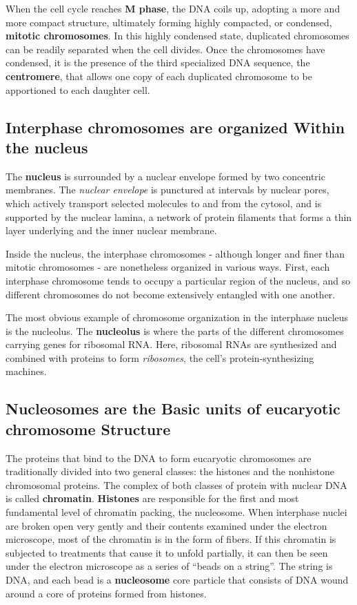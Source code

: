 When the cell cycle reaches \textbf{M phase}, the DNA coils up, adopting a more
and more compact structure, ultimately forming highly compacted, or
condensed, \textbf{mitotic chromosomes}. In this highly condensed state, duplicated
chromosomes can be readily separated when the cell divides.
Once the chromosomes have condensed, it is the presence of the
third specialized DNA sequence, the \textbf{centromere}, that allows one copy
of each duplicated chromosome to be apportioned to each daughter cell.

\subsection{Interphase chromosomes are organized Within the nucleus}

The \textbf{nucleus} is surrounded by a nuclear envelope formed by two concentric
membranes. The \textit{nuclear envelope} is punctured at intervals by
nuclear pores, which actively transport selected molecules to and from
the cytosol, and is supported by the
nuclear lamina, a network of protein filaments that forms a thin layer
underlying and the inner nuclear membrane.

Inside the nucleus, the interphase chromosomes - although longer and
finer than mitotic chromosomes - are nonetheless organized in various
ways. First, each interphase chromosome tends to occupy a particular
region of the nucleus, and so different chromosomes do not become
extensively entangled with one another.

The most obvious example of chromosome organization in the interphase
nucleus is the nucleolus. The \textbf{nucleolus} is where the
parts of the different chromosomes carrying genes for ribosomal RNA.
Here, ribosomal RNAs are synthesized and combined with proteins to
form \textit{ribosomes}, the cell’s protein-synthesizing machines.

\subsection{Nucleosomes are the Basic units of eucaryotic chromosome Structure}

The proteins that bind to the DNA to form eucaryotic chromosomes
are traditionally divided into two general classes: the histones and the
nonhistone chromosomal proteins.
The complex of both classes of protein with nuclear DNA is called \textbf{chromatin}.
\textbf{Histones} are responsible for the first and most fundamental level of chromatin
packing, the nucleosome. When interphase nuclei are broken open very gently
and their contents examined under the electron microscope, most of the chromatin is in the form
of fibers. If this chromatin is subjected
to treatments that cause it to unfold partially, it can
then be seen under the electron microscope as a series of “beads on
a string”. The string is DNA, and each bead is a \textbf{nucleosome}
core particle that consists of DNA wound around a core of proteins formed from histones.

